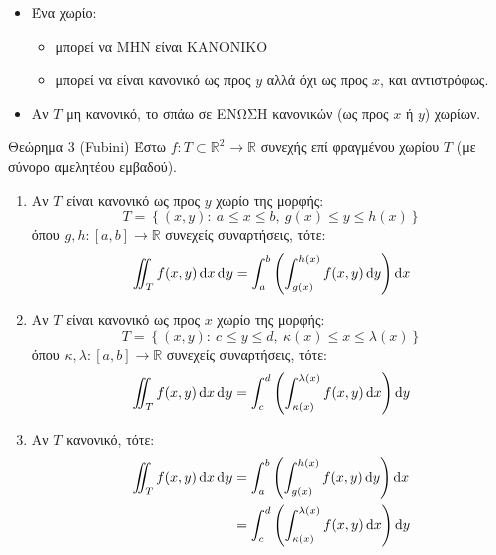 \documentclass[11pt,a4paper,titlepage]{article}
\newcommand{\textlatin}[1]{#1}
\begin{document}
\begin{itemize}
\item Ένα χωρίο:
\begin{itemize}
\item μπορεί να ΜΗΝ είναι ΚΑΝΟΝΙΚΟ
\item μπορεί να είναι κανονικό ως προς \(y\) αλλά όχι ως προς \(x\), και αντιστρόφως.
\end{itemize}
\item Αν \(T\) μη κανονικό, το σπάω σε ΕΝΩΣΗ κανονικών (ως προς \(x\) ή $y$) χωρίων.
\end{itemize}

\begin{attnbox}{Θεώρημα 3 (\textlatin{Fubini})}
Έστω \(f: T \subset  \mathbb R ^2 \to  \mathbb R \) συνεχής επί φραγμένου χωρίου \(T\) (με σύνορο αμελητέου εμβαδού).
\begin{enumerate}
\item Αν \(T\) είναι κανονικό ως προς \(y\) χωρίο της μορφής:
\[
T =  \left\lbrace (x,y):\ a \leq x \leq b, \ g(x) \leq y \leq h(x)  \right\rbrace
\]
όπου \(g,h: [a,b] \to  \mathbb R \) συνεχείς συναρτήσεις, τότε:
\[
\iint_T f(x,y) \dif x \dif y =
\int_a^b \left(
\int_{g(x)}^{h(x)} f(x,y) \dif y
\right) \dif x
\]
\item Αν \(T\) είναι κανονικό ως προς \(x\) χωρίο της μορφής:
\[
T =  \left\lbrace (x,y):\ c \leq y \leq d, \ \kappa (x) \leq x \leq \lambda(x)  \right\rbrace
\]
όπου \(\kappa,\lambda: [a,b] \to  \mathbb R \) συνεχείς συναρτήσεις, τότε:
\[
\iint_T f(x,y) \dif x \dif y =
\int_c^d \left(
\int_{\kappa(x)}^{\lambda(x)} f(x,y) \dif x
\right) \dif y
\]
\item Αν \(T\) κανονικό, τότε:
\begin{align*}
\iint_T f(x,y)\dif x \dif y
&=
\int_a^b \left(
\int_{g(x)}^{h(x)} f(x,y) \dif y
\right) \dif x \\
&=
\int_c^d \left(
\int_{\kappa(x)}^{\lambda(x)} f(x,y) \dif x
\right) \dif y
\end{align*}
\end{enumerate}
\end{attnbox}
\end{document}

